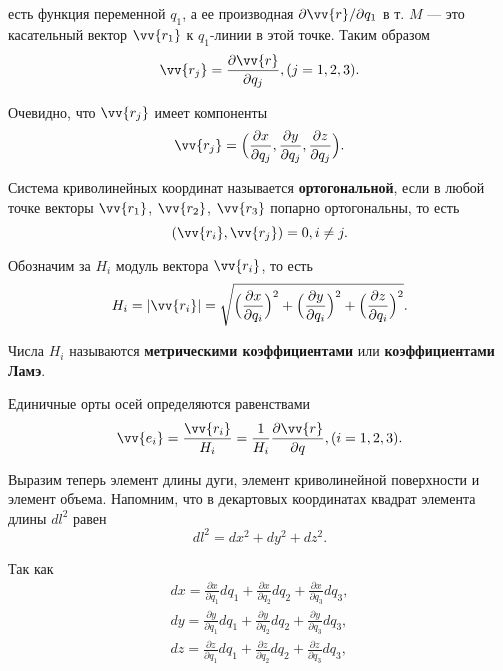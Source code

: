 \documentclass[a4paper,12pt,oneside]{extbook}
\theoremstyle{numbered}
\theoremstyle{unnumbered}
\theoremstyle{named}
\theoremstyle{unnumbered}
\theoremstyle{named}
\theoremstyle{named}
\theoremstyle{named}
\begin{document}
есть функция переменной \(q_1\), а ее производная \(\partial \vv{r} / \partial q_1\) в т. \(M\) — это касательный вектор \(\vv{r_1}\) к \(q_1\)-линии в этой точке. Таким образом
\begin{equation}
    \vv{r_j} = \frac{\partial \vv{r}}{\partial q_j}, (j = 1, 2, 3).
\end{equation}

Очевидно, что \(\vv{r_j}\) имеет компоненты
\begin{equation}
    \vv{r_j} =
    \Big(
    \frac{\partial x}{\partial q_j},
    \frac{\partial y}{\partial q_j},
    \frac{\partial z}{\partial q_j}
    \Big).
\end{equation}

Система криволинейных координат называется \textbf{ортогональной}, если в любой точке векторы \(\vv{r_1}\), \(\vv{r_2}\), \(\vv{r_3}\) попарно ортогональны, то есть
\begin{equation}
    (\vv{r_i}, \vv{r_j}) = 0, i \neq j.
\end{equation}

Обозначим за \(H_i\) модуль вектора \(\vv{r_i}\), то есть
\begin{equation}
    H_i = |\vv{r_i}| =
    \sqrt{
        \Big( \frac{\partial x}{\partial q_i} \Big)^2 +
        \Big( \frac{\partial y}{\partial q_i} \Big)^2 +
        \Big( \frac{\partial z}{\partial q_i} \Big)^2
    }.
\end{equation}

Числа \(H_i\) называются \textbf{метрическими коэффициентами} или \textbf{коэффициентами Ламэ}.

Единичные орты осей определяются равенствами
\begin{equation}
    \vv{e_i} = \frac{\vv{r_i}}{H_i} = \frac{1}{H_i} \frac{\partial \vv{r}}{\partial q},
    (i = 1, 2, 3).
\end{equation}

Выразим теперь элемент длины дуги, элемент криволинейной поверхности и элемент объема. Напомним, что в декартовых координатах квадрат элемента длины \(dl^2\) равен
\begin{equation}
    dl^2 = dx^2 + dy^2 + dz^2.
\end{equation}

Так как
\begin{equation}
    \begin{gathered}
        dx = \frac{\partial x}{\partial q_1} dq_1 + \frac{\partial x}{\partial q_2} dq_2 + \frac{\partial x}{\partial q_3} dq_3, \\
        dy = \frac{\partial y}{\partial q_1} dq_1 + \frac{\partial y}{\partial q_2} dq_2 + \frac{\partial y}{\partial q_3} dq_3, \\
        dz = \frac{\partial z}{\partial q_1} dq_1 + \frac{\partial z}{\partial q_2} dq_2 + \frac{\partial z}{\partial q_3} dq_3,
    \end{gathered}
\end{equation}
\end{document}
